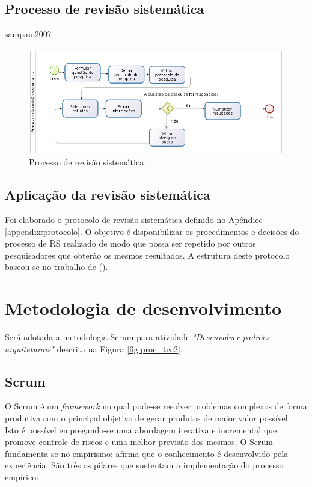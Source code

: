 \subsection{Processo de revisão sistemática}

sampaio2007

\begin{figure}[!htb]
    \centering
    \includegraphics[scale=0.5]{figuras/processo_rs}
    \caption{Processo de revisão sistemática.}
    \label{fig:processo_rs}     
\end{figure}

\pagebreak


\subsection{Aplicação da revisão sistemática}

Foi elaborado o protocolo de revisão sistemática definido no Apêndice \ref{appendix:protocolo}. O objetivo é disponibilizar os procedimentos e decisões do processo de RS realizado de modo que possa ser repetido por outros pesquisadores que obterão os mesmos resultados. A estrutura deste protocolo baseou-se no trabalho de \citeauthor{ramaiane2014} (\citeyear{ramaiane2014}).


\section{Metodologia de desenvolvimento} \label{sec:metodologia_desenvolvimento}

Será adotada a metodologia Scrum para atividade \textit{"Desenvolver padrões arquiteturais"} descrita na Figura \ref{fig:proc_tcc2}. 

\subsection{Scrum} \label{sec:scrum}

O Scrum é um \textit{framework} no qual pode-se resolver problemas complexos de forma produtiva com o principal objetivo de gerar produtos de maior valor possível \cite{schwaber2016}. Isto é possível empregando-se uma abordagem iterativa e incremental que promove controle de riscos e uma melhor previsão dos mesmos. O Scrum fundamenta-se no empirismo: afirma que o conhecimento é desenvolvido pela experiência. São três os pilares que sustentam a implementação do processo empírico:

